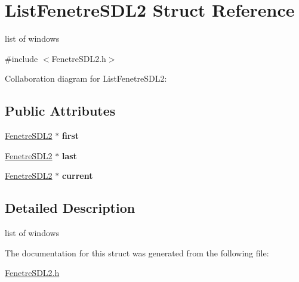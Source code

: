 \hypertarget{structListFenetreSDL2}{}\section{List\+Fenetre\+S\+D\+L2 Struct Reference}
\label{structListFenetreSDL2}


list of windows  




{\ttfamily \#include $<$Fenetre\+S\+D\+L2.\+h$>$}



Collaboration diagram for List\+Fenetre\+S\+D\+L2\+:
\subsection*{Public Attributes}
\begin{DoxyCompactItemize}
\item 
\hyperlink{structFenetreSDL2}{Fenetre\+S\+D\+L2} $\ast$ {\bfseries first}\hypertarget{structListFenetreSDL2_a3e98a4f91573e5dd33642faf081eec53}{}\label{structListFenetreSDL2_a3e98a4f91573e5dd33642faf081eec53}

\item 
\hyperlink{structFenetreSDL2}{Fenetre\+S\+D\+L2} $\ast$ {\bfseries last}\hypertarget{structListFenetreSDL2_ab5792864d3b0449f51f7ccc33941b6eb}{}\label{structListFenetreSDL2_ab5792864d3b0449f51f7ccc33941b6eb}

\item 
\hyperlink{structFenetreSDL2}{Fenetre\+S\+D\+L2} $\ast$ {\bfseries current}\hypertarget{structListFenetreSDL2_a3a7fea2f3274fbf1de33b4a986aee120}{}\label{structListFenetreSDL2_a3a7fea2f3274fbf1de33b4a986aee120}

\end{DoxyCompactItemize}


\subsection{Detailed Description}
list of windows 

The documentation for this struct was generated from the following file\+:\begin{DoxyCompactItemize}
\item 
\hyperlink{FenetreSDL2_8h}{Fenetre\+S\+D\+L2.\+h}\end{DoxyCompactItemize}
